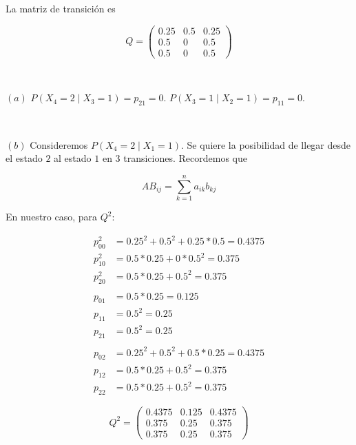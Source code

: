 \documentclass[a4paper, 12pt]{article}
\begin{document}
La matriz de transición es 

\begin{equation*}
    Q = \begin{pmatrix}
        0.25 & 0.5 & 0.25 \\ 
        0.5 & 0 & 0.5 \\ 
        0.5 & 0 & 0.5
    \end{pmatrix} 
\end{equation*}

~

$(a)$ $P(X_4 = 2 \mid X_3 = 1) = p_{21} = 0$. $P(X_3 = 1 \mid X_2 = 1) = p_{11}
= 0$.

~

$(b)$ Consideremos $P(X_4 = 2 \mid X_1 = 1)$. Se quiere la posibilidad de llegar
desde el estado $2$ al estado $1$ en $3$ transiciones. Recordemos que 

\begin{equation*}
    AB_{ij} = \sum_{k=1}^n a_{ik}b_{kj}
\end{equation*}

En nuestro caso, para  $Q^2$:

\begin{align*}
    p^{2}_{00} &= 0.25^2 + 0.5^2 + 0.25 * 0.5 = 0.4375\\
    p^{2}_{10} &= 0.5 * 0.25 + 0 * 0.5^2 = 0.375\\
    p^{2}_{20} &= 0.5*0.25 + 0.5^2  = 0.375 \\ 
               &~ \\ 
    p_{01} &= 0.5 * 0.25 = 0.125\\ 
    p_{11} &= 0.5^2 = 0.25 \\ 
    p_{21} &= 0.5^2 = 0.25\\ 
           &~ \\ 
    p_{02} &= 0.25^2 + 0.5^2 + 0.5*0.25 = 0.4375\\ 
    p_{12} &= 0.5*0.25 + 0.5^2 = 0.375 \\ 
    p_{22} &= 0.5*0.25 + 0.5^2 = 0.375
\end{align*}

\begin{equation*}
    Q^2 = \begin{pmatrix}
        0.4375 & 0.125 & 0.4375 \\ 
        0.375 & 0.25 & 0.375 \\ 
        0.375 & 0.25 & 0.375
    \end{pmatrix} 
\end{equation*}
\end{document}
